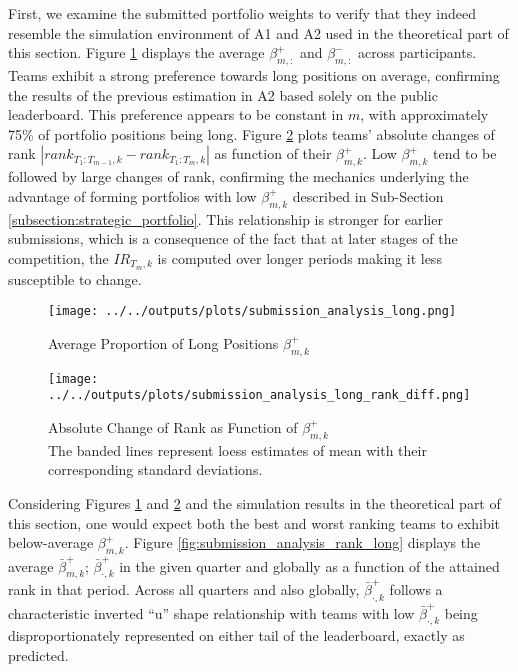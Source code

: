 \documentclass[3p,times,twocolumn]{elsarticle}
\begin{document}
First, we examine the submitted portfolio weights to verify that they indeed resemble the simulation environment of A1 and A2 used in the theoretical part of this section.
Figure \ref{fig:submission_analysis_long} displays the average $\beta^{+}_{m,:}$ and $\beta^{-}_{m,:}$ across participants.
Teams exhibit a strong preference towards long positions on average, confirming the results of the previous estimation in A2 based solely on the public leaderboard.
This preference appears to be constant in $m$, with approximately 75\% of portfolio positions being long.
Figure \ref{fig:submission_analysis_long_rank_diff} plots teams' absolute changes of rank $|rank_{T_{1}:T_{m-1},k} -rank_{T_{1}:T_{m},k}|$ as function of their $\beta^{+}_{m,k}$.
Low $\beta^{+}_{m,k}$ tend to be followed by large changes of rank, confirming the mechanics underlying the advantage of forming portfolios with low $\beta^{+}_{m,k}$ described in Sub-Section \ref{subsection:strategic_portfolio}.
This relationship is stronger for earlier submissions, which is a consequence of the fact that at later stages of the competition, the $IR_{T_{m},k}$ is computed over longer periods making it less susceptible to change.

\begin{figure}[!htbp]
    \centering
    \texttt{[image: ../../outputs/plots/submission\_analysis\_long.png]}
    \caption{Average Proportion of Long Positions $\beta_{m,k}^{+}$}
    \label{fig:submission_analysis_long}
\end{figure}

\begin{figure}[!htbp]
    \centering
    \texttt{[image: ../../outputs/plots/submission\_analysis\_long\_rank\_diff.png]}
    \caption{Absolute Change of Rank as Function of $\beta_{m,k}^{+}$\\
        The banded lines represent loess estimates of mean with their corresponding standard deviations.
    }
    \label{fig:submission_analysis_long_rank_diff}
\end{figure}

Considering Figures \ref{fig:submission_analysis_long} and \ref{fig:submission_analysis_long_rank_diff} and the simulation results in the theoretical part of this section, one would expect both the best and worst ranking teams to exhibit below-average $\beta^{+}_{m,k}$.
Figure \ref{fig:submission_analysis_rank_long} displays the average $\bar{\beta}^{+}_{m,k}$; $\bar{\beta}^{+}_{\cdot,k}$ in the given quarter and globally as a function of the attained rank in that period.
Across all quarters and also globally, $\bar{\beta}^{+}_{\cdot,k}$ follows a characteristic inverted ``u'' shape relationship with teams with low $\bar{\beta}^{+}_{\cdot,k}$ being disproportionately represented on either tail of the leaderboard, exactly as predicted.
\end{document}
